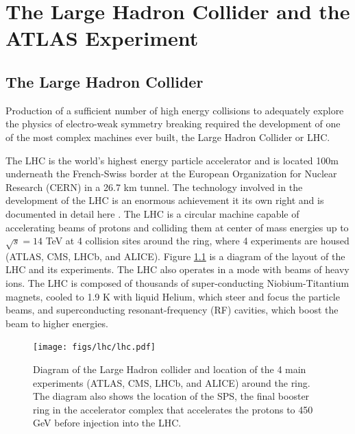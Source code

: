 \chapter[The Large Hadron Collider and the ATLAS Experiment][The Large Hadron Collider and the ATLAS Experiment]{The Large Hadron Collider and the ATLAS Experiment}
\label{chapter:lhc}
\section{The Large Hadron Collider}


Production of a sufficient number of high energy collisions to adequately explore
the physics of electro-weak symmetry breaking required the development of one
of the most complex machines ever built, the Large Hadron Collider or LHC. 

The LHC is the world's highest energy particle accelerator 
and is located 100m underneath the French-Swiss border at the European Organization
for Nuclear Research (CERN) in a 26.7 km tunnel. The technology involved in the development of the LHC is an enormous achievement
it its own right and is documented in detail here \cite{1748-0221-3-08-S08001,Pettersson:291782,Linnecar:1176380}. 
The LHC is a circular machine capable of accelerating beams of protons and colliding them at center of mass 
energies up to $\sqrt{s} = 14$ TeV at 4 collision sites around the ring, where 4 experiments
are housed (ATLAS\cite{ATLAS_detector}, CMS\cite{1748-0221-3-08-S08004}, LHCb\cite{1748-0221-3-08-S08005}, and ALICE\cite{1748-0221-3-08-S08002}). Figure \ref{figure:lhc_lhc} is a diagram
of the layout of the LHC and its experiments\cite{Team:40525}. The LHC also operates in a mode with beams of 
heavy ions. The LHC is composed of thousands of super-conducting Niobium-Titantium 
magnets, cooled to 1.9 K with liquid Helium, which steer and focus the 
particle beams, and superconducting resonant-frequency (RF) cavities, which boost the beam
to higher energies. 

\begin{figure}[!t]
\centering 
\texttt{[image: figs/lhc/lhc.pdf]}
\caption{ Diagram of the Large Hadron collider and location of the 4 main experiments (ATLAS, CMS, LHCb, and ALICE) around
  the ring. The diagram also shows the location of the SPS, the final booster ring in the accelerator complex that accelerates
    the protons to 450 GeV before injection into the LHC. 
}
\label{figure:lhc_lhc}
\end{figure}



